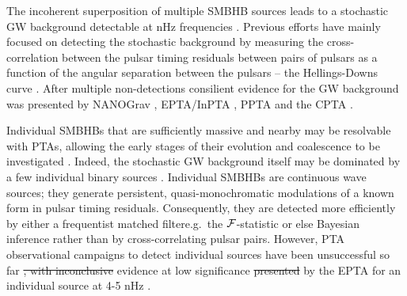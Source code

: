 \documentclass[fleqn,usenatbib,useAMS]{mnras}
\providecommand{\DIFadd}[1]{{\protect\color{blue}\uwave{#1}}} %
\providecommand{\DIFdel}[1]{{\protect\color{red}\sout{#1}}}                      %
\providecommand{\DIFaddbegin}{} %
\providecommand{\DIFaddend}{} %
\providecommand{\DIFdelbegin}{} %
\providecommand{\DIFdelend}{} %
\newcommand{\DIFscaledelfig}{0.5}
\newlength{\DIFdelgraphicswidth} %
\newlength{\DIFdelgraphicsheight} %
\newcommand{\DIFaddincludegraphics}[2][]{{\color{blue}\fbox{\DIFOincludegraphics[#1]{#2}}}} %
\newcommand{\DIFdelincludegraphics}[2][]{%
\sbox{\DIFdelgraphicsbox}{\DIFOincludegraphics[#1]{#2}}%
\settoboxwidth{\DIFdelgraphicswidth}{\DIFdelgraphicsbox} %
\settoboxtotalheight{\DIFdelgraphicsheight}{\DIFdelgraphicsbox} %
\scalebox{\DIFscaledelfig}{%
\parbox[b]{\DIFdelgraphicswidth}{\usebox{\DIFdelgraphicsbox}\\[-\baselineskip] \rule{\DIFdelgraphicswidth}{0em}}\llap{\resizebox{\DIFdelgraphicswidth}{\DIFdelgraphicsheight}{%
\setlength{\unitlength}{\DIFdelgraphicswidth}%
\begin{picture}(1,1)%
\thicklines\linethickness{2pt} %
{\color[rgb]{1,0,0}\put(0,0){\framebox(1,1){}}}%
{\color[rgb]{1,0,0}\put(0,0){\line( 1,1){1}}}%
{\color[rgb]{1,0,0}\put(0,1){\line(1,-1){1}}}%
\end{picture}%
}\hspace*{3pt}}} %
} %
\DeclareRobustCommand{\DIFaddbegin}{\DIFOaddbegin \let\includegraphics\DIFaddincludegraphics} %
\DeclareRobustCommand{\DIFaddend}{\DIFOaddend \let\includegraphics\DIFOincludegraphics} %
\DeclareRobustCommand{\DIFdelbegin}{\DIFOdelbegin \let\includegraphics\DIFdelincludegraphics} %
\DeclareRobustCommand{\DIFdelend}{\DIFOaddend \let\includegraphics\DIFOincludegraphics} %
\begin{document}
The incoherent superposition of multiple SMBHB sources leads to a stochastic GW background detectable at nHz frequencies \citep{Allen1997,Sesana10,Christensen2019,Renzini2022}. Previous efforts have mainly focused on detecting the stochastic background by measuring the cross-correlation between the pulsar timing residuals between pairs of pulsars as a function of the angular separation between the pulsars -- the Hellings-Downs curve \citep{Hellings}. After multiple non-detections \citep{Lentati2015,NanoGrav2018,2022MNRAS.510.4873A} consilient evidence for the GW background was presented by NANOGrav \citep{2023ApJ...951L...8A}, EPTA/InPTA \citep{2023arXiv230616214A}, PPTA \citep{2023ApJ...951L...6R} and the CPTA \citep{2023RAA....23g5024X}. \newline 


Individual SMBHBs that are sufficiently massive and nearby may be resolvable with PTAs, allowing the early stages of their evolution and coalescence to be investigated \citep{Sesana2010,Yardley2010,Zhu10,Babak2012,2013CQGra..30v4004E,Zhupulsarterms}. 
Indeed, the stochastic GW background itself may be dominated by a few individual binary sources \citep{Ravi2012singlesource}. Individual SMBHBs are continuous wave sources; they generate persistent, quasi-monochromatic modulations of a known form in pulsar timing residuals. Consequently, they are detected more efficiently by either a frequentist matched filter\DIFaddbegin \DIFadd{, }\DIFaddend e.g.\ the ${\cal F}$-statistic \citep{Lee2011MNRAS.414.3251L, Ellis2012ApJ,Zhu2014PPTA}\DIFaddbegin \DIFadd{, }\DIFaddend or else Bayesian inference \citep{Ellis2016,Arzoumanian2020A}\DIFaddbegin \DIFadd{, }\DIFaddend rather than by cross-correlating pulsar pairs. However, PTA observational campaigns to detect individual sources have been unsuccessful so far \citep{Jenet2004,Zhu2014PPTA,Babak2016,Arzoumanian2023}\DIFdelbegin \DIFdel{, with inconclusive }\DIFdelend \DIFaddbegin \DIFadd{. Inconclusive }\DIFaddend evidence at low significance \DIFdelbegin \DIFdel{presented }\DIFdelend \DIFaddbegin \DIFadd{was presented recently }\DIFaddend by the EPTA for an individual source at 4-5 nHz \citep{2023arXiv230616226A}. \newline 
\end{document}
